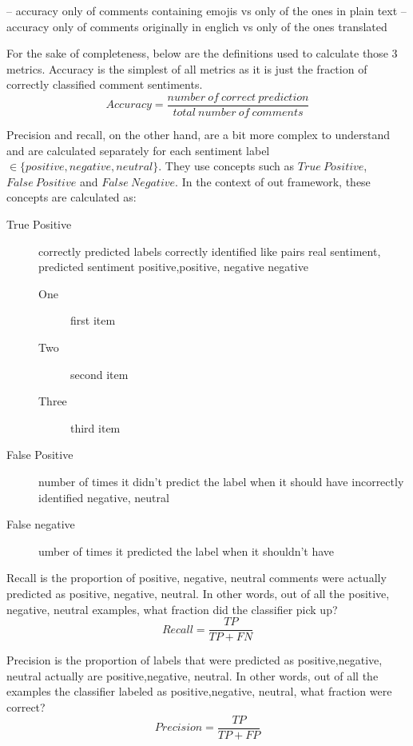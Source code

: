 -- accuracy only of comments containing emojis vs only of the ones in plain text
-- accuracy only of comments originally in englich vs only of the ones translated

For the sake of completeness, below are the definitions used to calculate those 3 metrics.
Accuracy is the simplest of all metrics as it is just the fraction of correctly classified comment sentiments.
\[Accuracy = \frac{number\ of\ correct\ prediction}{total\ number \ of\ comments}\]

Precision and recall, on the other hand, are a bit more complex to understand and are calculated separately for each sentiment label $ \in \{ positive, negative, neutral \}$. 
They use concepts such as $True\ Positive$, $False\ Positive$  and $False\ Negative$.
In the context of out framework, these concepts are calculated as:
\begin{description}
 \item[True Positive] 
 correctly predicted labels
correctly identified like pairs {real sentiment, predicted sentiment} 
 {positive,positive}, {negative negative}
 \begin{description}
 \item[One] first item
 \item[Two] second item
 \item[Three] third item
\end{description}

 \item[False Positive]  
 number of times it didn't predict the label when it should have
 incorrectly identified {negative, neutral}
 \item[False negative] 
 umber of times it predicted the label when it shouldn't have 
\end{description}

Recall is the proportion of {positive, negative, neutral} comments were actually predicted as {positive, negative, neutral}. In other words, out of all the {positive, negative, neutral} examples, what fraction did the classifier pick up?
\[Recall = \frac{TP}{TP + FN }\]


Precision is the proportion of labels that were predicted as {positive,negative, neutral} actually are {positive,negative, neutral}. In other words, out of all the examples the classifier labeled as {positive,negative, neutral}, what fraction were correct?
\[Precision = \frac{TP}{TP + FP }\]